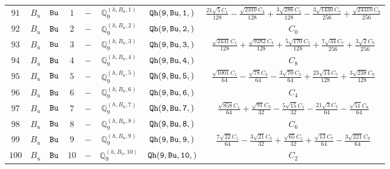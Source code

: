 \documentclass[fleqn,8pt]{jsarticle}
\begin{document}
\begin{table}[ht!]
\begin{center}
\begin{tabular}{cccccccc}
$ 91 $ & $ B_{u} $ & $ {\tt Bu} $ & $ 1 $ & $ - $ & $ \mathbb{Q}_{9}^{(h,B_{u},1)} $ & $ {\tt Qh(9,Bu,1,)} $ & $ \frac{21 \sqrt{5} C_{1}}{128} - \frac{\sqrt{2310} C_{3}}{128} + \frac{3 \sqrt{286} C_{5}}{128} - \frac{3 \sqrt{1430} C_{7}}{256} + \frac{\sqrt{24310} C_{9}}{256} $ \\
$ 92 $ & $ B_{u} $ & $ {\tt Bu} $ & $ 2 $ & $ - $ & $ \mathbb{Q}_{9}^{(h,B_{u},2)} $ & $ {\tt Qh(9,Bu,2,)} $ & $ C_{0} $ \\
$ 93 $ & $ B_{u} $ & $ {\tt Bu} $ & $ 3 $ & $ - $ & $ \mathbb{Q}_{9}^{(h,B_{u},3)} $ & $ {\tt Qh(9,Bu,3,)} $ & $ \frac{\sqrt{2431} C_{1}}{128} + \frac{\sqrt{9282} C_{3}}{128} + \frac{5 \sqrt{170} C_{5}}{128} + \frac{7 \sqrt{34} C_{7}}{256} + \frac{3 \sqrt{2} C_{9}}{256} $ \\
$ 94 $ & $ B_{u} $ & $ {\tt Bu} $ & $ 4 $ & $ - $ & $ \mathbb{Q}_{9}^{(h,B_{u},4)} $ & $ {\tt Qh(9,Bu,4,)} $ & $ C_{8} $ \\
$ 95 $ & $ B_{u} $ & $ {\tt Bu} $ & $ 5 $ & $ - $ & $ \mathbb{Q}_{9}^{(h,B_{u},5)} $ & $ {\tt Qh(9,Bu,5,)} $ & $ \frac{\sqrt{1001} C_{1}}{64} - \frac{\sqrt{78} C_{3}}{64} - \frac{3 \sqrt{70} C_{5}}{64} + \frac{23 \sqrt{14} C_{7}}{128} + \frac{3 \sqrt{238} C_{9}}{128} $ \\
$ 96 $ & $ B_{u} $ & $ {\tt Bu} $ & $ 6 $ & $ - $ & $ \mathbb{Q}_{9}^{(h,B_{u},6)} $ & $ {\tt Qh(9,Bu,6,)} $ & $ C_{4} $ \\
$ 97 $ & $ B_{u} $ & $ {\tt Bu} $ & $ 7 $ & $ - $ & $ \mathbb{Q}_{9}^{(h,B_{u},7)} $ & $ {\tt Qh(9,Bu,7,)} $ & $ \frac{\sqrt{858} C_{1}}{64} + \frac{\sqrt{91} C_{3}}{32} - \frac{5 \sqrt{15} C_{5}}{32} - \frac{21 \sqrt{3} C_{7}}{64} - \frac{\sqrt{51} C_{9}}{64} $ \\
$ 98 $ & $ B_{u} $ & $ {\tt Bu} $ & $ 8 $ & $ - $ & $ \mathbb{Q}_{9}^{(h,B_{u},8)} $ & $ {\tt Qh(9,Bu,8,)} $ & $ C_{6} $ \\
$ 99 $ & $ B_{u} $ & $ {\tt Bu} $ & $ 9 $ & $ - $ & $ \mathbb{Q}_{9}^{(h,B_{u},9)} $ & $ {\tt Qh(9,Bu,9,)} $ & $ \frac{7 \sqrt{22} C_{1}}{64} - \frac{3 \sqrt{21} C_{3}}{32} + \frac{\sqrt{65} C_{5}}{32} + \frac{\sqrt{13} C_{7}}{64} - \frac{3 \sqrt{221} C_{9}}{64} $ \\
$ 100 $ & $ B_{u} $ & $ {\tt Bu} $ & $ 10 $ & $ - $ & $ \mathbb{Q}_{9}^{(h,B_{u},10)} $ & $ {\tt Qh(9,Bu,10,)} $ & $ C_{2} $ \\
 \hline \hline
\end{tabular}
\end{center}
\end{table}
\end{document}
